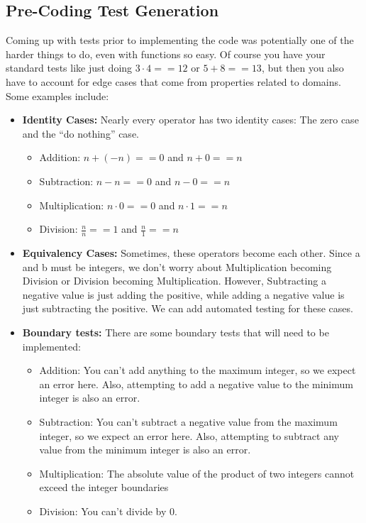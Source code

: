 \documentclass{article}
\begin{document}
\subsection{Pre-Coding Test Generation}

Coming up with tests prior to implementing the code was potentially
one of the harder things to do, even with functions so easy. Of course
you have your standard tests like just doing $3 \cdot 4 == 12$ or
$5 + 8 == 13$, but then you also have to account for edge cases that
come from properties related to domains. Some examples include:

\begin{itemize}

    \item \textbf{Identity Cases:} Nearly every operator has two
        identity cases: The zero case and the ``do nothing'' case.

        \begin{itemize}
            \item Addition: $n + (-n) == 0$ and  $n + 0 == n$
            \item Subtraction: $n - n == 0$ and $n - 0 == n$
            \item Multiplication: $n \cdot 0 == 0$ and $n \cdot
                1 == n$
            \item Division: $\frac{n}{n} == 1$ and $\frac{n}{1} == n$
        \end{itemize}

    \item \textbf{Equivalency Cases:} Sometimes, these operators
        become each other. Since a and b must be integers, we don't
        worry about Multiplication becoming Division or Division
        becoming Multiplication. However, Subtracting a negative value
        is just adding the positive, while adding a negative value is
        just subtracting the positive. We can add automated testing
        for these cases.

    \item \textbf{Boundary tests:} There are some boundary tests that
    will need to be implemented:

        \begin{itemize}
            \item Addition: You can't add anything to the maximum
                integer, so we expect an error here. Also, attempting
                to add a negative value to the minimum integer is also
                an error.
            \item Subtraction: You can't subtract a negative value
                from the maximum integer, so we expect an error here.
                Also, attempting to subtract any value from the
                minimum integer is also an error.
            \item Multiplication: The absolute value of the product of
                two integers cannot exceed the integer boundaries
            \item Division: You can't divide by 0.
        \end{itemize}

\end{itemize}
\end{document}
